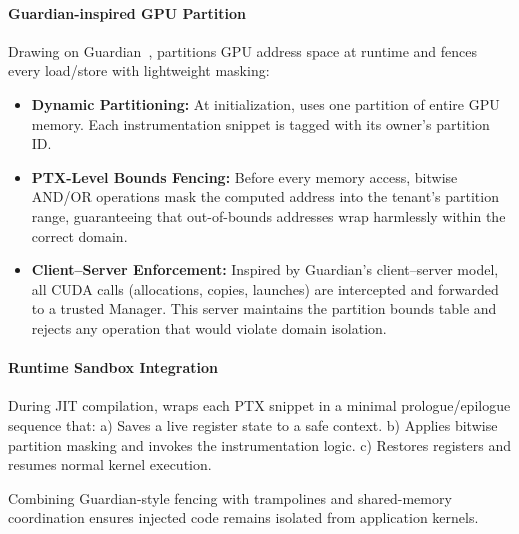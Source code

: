 \paragraph{Guardian-inspired GPU Partition}
Drawing on Guardian~\cite{pavlidakis2024guardian}, \sys partitions GPU address space at runtime and fences every load/store with lightweight masking:

\begin{itemize}[leftmargin=*,itemsep=0pt]
  \item \textbf{Dynamic Partitioning:} At initialization, \sys{} uses one partition of entire GPU memory. Each instrumentation snippet is tagged with its owner's partition ID.
  \item \textbf{PTX-Level Bounds Fencing:} Before every memory access, bitwise AND/OR operations mask the computed address into the tenant's partition range, guaranteeing that out-of-bounds addresses wrap harmlessly within the correct domain.
  \item \textbf{Client–Server Enforcement:} Inspired by Guardian's client–server model, all CUDA calls (allocations, copies, launches) are intercepted and forwarded to a trusted Manager. This server maintains the partition bounds table and rejects any operation that would violate domain isolation.
\end{itemize}

\paragraph{Runtime Sandbox Integration}
During JIT compilation, \sys{} wraps each PTX snippet in a minimal prologue/epilogue sequence that:
  a) Saves a live register state to a safe context.
  b) Applies bitwise partition masking and invokes the instrumentation logic.
  c) Restores registers and resumes normal kernel execution.

Combining Guardian-style fencing with trampolines and shared-memory coordination ensures injected code remains isolated from application kernels.
